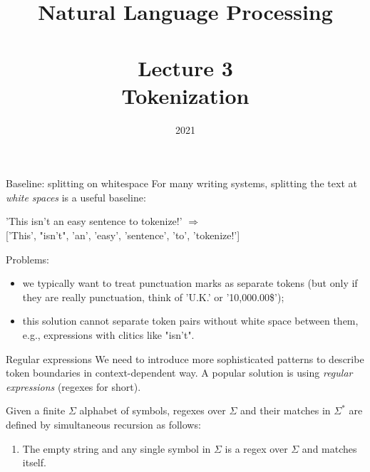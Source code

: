 \documentclass[style=upen, size=14pt]{powerdot}
\newcommand{\gold}{\color{arany}}
\theoremstyle{definition}
\begin{document}
\title{Natural Language Processing\\~~\\Lecture 3\\Tokenization}

\date{2021}
\maketitle

\begin{slide}[toc=Whitespace splitting]{Baseline: splitting on whitespace}
  For many writing systems, splitting the text at \emph{white spaces} is a
  useful baseline:\bigskip

  'This isn't an easy sentence to tokenize!' $\Rightarrow$ \\
  
  ['This', "isn't", 'an', 'easy', 'sentence', 'to', 'tokenize!']\bigskip

  Problems:
  \begin{itemize}
  \item we typically want to treat punctuation marks as separate tokens (but
    only if they are really punctuation, think of 'U.K.' or '10,000.00\$'); 
  \item this solution cannot separate token pairs without white space between
    them, e.g.,  expressions with clitics like "isn't".
  \end{itemize}
\end{slide}

\begin{slide}[toc=Regular expressions]{Regular expressions}
  We need to introduce more sophisticated patterns to describe token boundaries
  in context-dependent way. A popular solution is using \emph{\gold regular
    expressions} (regexes for short).\bigskip

  Given a finite $\Sigma$ alphabet of symbols, regexes over $\Sigma$ and their
  matches in $\Sigma^*$ are defined by simultaneous recursion as follows:
  \begin{enumerate} 
  \item The empty string and any single symbol in $\Sigma$ is a regex
    over $\Sigma$ and matches itself.
  \end{enumerate}
\end{slide}
\end{document}
